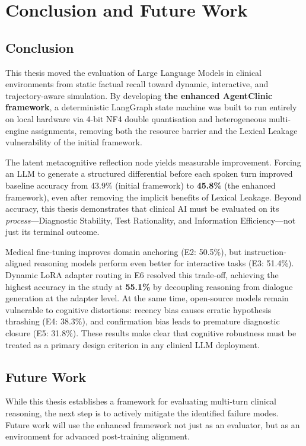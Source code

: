\chapter{Conclusion and Future Work}
\label{Chapter8}

\section{Conclusion}

This thesis moved the evaluation of Large Language Models in clinical environments from static factual recall toward dynamic, interactive, and trajectory-aware simulation. By developing \textbf{the enhanced AgentClinic framework}, a deterministic LangGraph state machine was built to run entirely on local hardware via 4-bit NF4 double quantisation and heterogeneous multi-engine assignments, removing both the resource barrier and the Lexical Leakage vulnerability of the initial framework.

The latent metacognitive reflection node yields measurable improvement. Forcing an LLM to generate a structured differential before each spoken turn improved baseline accuracy from 43.9\% (initial framework) to \textbf{45.8\%} (the enhanced framework), even after removing the implicit benefits of Lexical Leakage. Beyond accuracy, this thesis demonstrates that clinical AI must be evaluated on its \textit{process}---Diagnostic Stability, Test Rationality, and Information Efficiency---not just its terminal outcome.

Medical fine-tuning improves domain anchoring (E2: 50.5\%), but instruction-aligned reasoning models perform even better for interactive tasks (E3: 51.4\%). Dynamic LoRA adapter routing in E6 resolved this trade-off, achieving the highest accuracy in the study at \textbf{55.1\%} by decoupling reasoning from dialogue generation at the adapter level. At the same time, open-source models remain vulnerable to cognitive distortions: recency bias causes erratic hypothesis thrashing (E4: 38.3\%), and confirmation bias leads to premature diagnostic closure (E5: 31.8\%). These results make clear that cognitive robustness must be treated as a primary design criterion in any clinical LLM deployment.
\section{Future Work}

While this thesis establishes a framework for evaluating multi-turn clinical reasoning, the next step is to actively mitigate the identified failure modes. Future work will use the enhanced framework not just as an evaluator, but as an environment for advanced post-training alignment.

